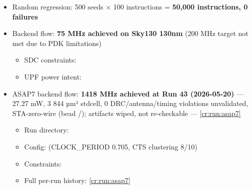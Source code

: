 \begin{record}
\begin{itemize}
  \begin{itemize}
  \tightlist
  \item
    smoke\_\allowbreak{}uvm: 4/4 PASS
  \item
    isa\_uvm: 54/54 PASS (37/37 RV32I instructions + CSR)
  \item
    pipeline\_\allowbreak{}hazards: 16/16 PASS (RAW/\allowbreak{}control
    hazards, forwarding, store-store, JAL rd)
  \item
    interrupts: 12/12 PASS (timer/\allowbreak{}ext IRQ, MIE gating,
    MRET, CSR insns, latency ≤3 cyc)
  \item
    debug: 6/6 PASS (single-step, BP0/BP1, GPR write, PC write, reg
    reads)
  \item
    axi\_\allowbreak{}protocol: 12/12 PASS (back-pressure, error
    injection, arbiter)
  \item
    fault\_\allowbreak{}injection: 7/7 PASS (misaligned, illegal, AXI
    fetch error)
  \end{itemize}
\item
  \ok{} Random regression: 500 seeds × 100 instructions = \textbf{50,000
  instructions, 0 failures}
\item
  \ok{} Backend flow: \textbf{75 MHz achieved on Sky130 130nm} (200 MHz
  target not met due to PDK limitations)

  \begin{itemize}
  \tightlist
  \item
    SDC constraints: 
  \item
    UPF power intent: 
  \end{itemize}
\item
  \ok{} ASAP7 backend flow: \textbf{1418 MHz achieved at Run 43
  (2026-05-20)} --- 27.27 mW, 3 844 µm² stdcell, 0
  DRC/\allowbreak{}antenna/\allowbreak{}timing violations \warn{}
  unvalidated, STA-zero-wire (bead /); artifacts
  wiped, not re-checkable --- \cref{cr:run:asap7}

  \begin{itemize}
  \tightlist
  \item
    Run directory: 
  \item
    Config:  (CLOCK\_\allowbreak{}PERIOD
    0.705, CTS clustering 8/10)
  \item
    Constraints: 
  \item
    Full per-run history: \cref{cr:run:asap7}
  \end{itemize}
\end{itemize}

\end{record}

